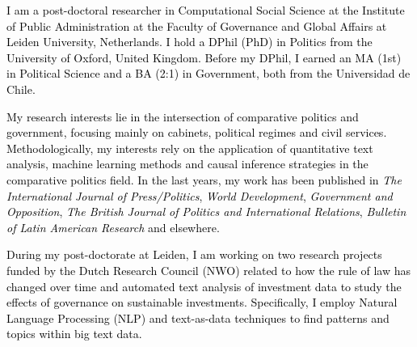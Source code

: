 




\vspace{3mm}

\begin{cvparagraph}

\textcolor{black}{I am a post-doctoral researcher in Computational Social Science at the Institute of Public Administration at the Faculty of Governance and Global Affairs at Leiden University, Netherlands. I hold a DPhil (PhD) in Politics from the University of Oxford, United Kingdom. Before my DPhil, I earned an MA (1st) in Political Science and a BA (2:1) in Government, both from the Universidad de Chile.}

\textcolor{black}{My research interests lie in the intersection of comparative politics and government, focusing mainly on cabinets, political regimes and civil services. Methodologically, my interests rely on the application of quantitative text analysis, machine learning methods and causal inference strategies in the comparative politics field. In the last years, my work has been published in {\itshape The International Journal of Press/Politics}, {\itshape World Development}, {\itshape Government and Opposition}, {\itshape The British Journal of Politics and International Relations}, {\itshape Bulletin of Latin American Research} and elsewhere.}

\textcolor{black}{During my post-doctorate at Leiden, I am working on two research projects funded by the Dutch Research Council (NWO) related to how the rule of law has changed over time and automated text analysis of investment data to study the effects of governance on sustainable investments. Specifically, I employ Natural Language Processing (NLP) and text-as-data techniques to find patterns and topics within big text data.}
\vspace{1mm}
\end{cvparagraph}
